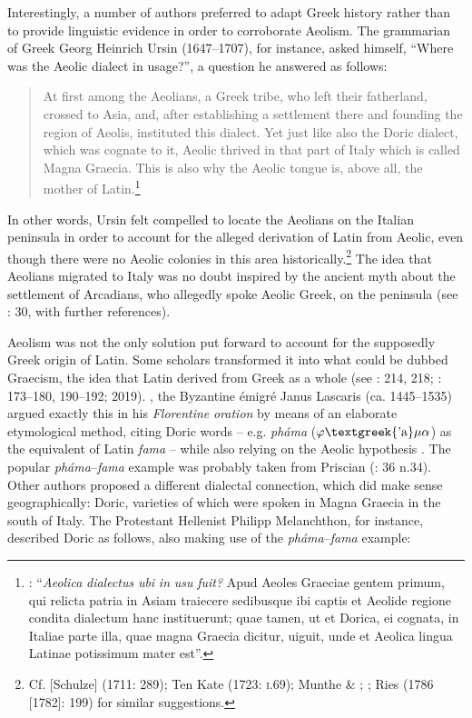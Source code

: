 Interestingly, a number of authors preferred to adapt Greek history rather than to provide linguistic evidence in order to corroborate Aeolism. The grammarian of Greek Georg Heinrich Ursin (1647–1707), for instance, asked himself, “Where was the Aeolic dialect in usage?”, a question he answered as follows:

\begin{quote}
At first among the Aeolians, a Greek tribe, who left their fatherland, crossed to Asia, and, after establishing a settlement there and founding the region of Aeolis, instituted this dialect. Yet just like also the Doric dialect, which was cognate to it, Aeolic thrived in that part of Italy which is called Magna Graecia. This is also why the Aeolic tongue is, above all, the mother of Latin.\footnote{\citet[509]{Ursin1691}: “\textit{Aeolica} \textit{dialectus} \textit{ubi} \textit{in} \textit{usu} \textit{fuit?} Apud Aeoles Graeciae gentem primum, qui relicta patria in Asiam traiecere sedibusque ibi captis et Aeolide regione condita dialectum hanc instituerunt; quae tamen, ut et Dorica, ei cognata, in Italiae parte illa, quae magna Graecia dicitur, uiguit, unde et Aeolica lingua Latinae potissimum mater est”.}
\end{quote}

In other words, Ursin felt compelled to locate the Aeolians on the Italian peninsula in order to account for the alleged derivation of Latin from Aeolic, even though there were no Aeolic colonies in this area historically.\footnote{Cf. [Schulze] (1711: 289); Ten Kate (1723: \textsc{i}.69); Munthe \& \citet[30]{Heiberg1748}; \citet[89]{Facius1782}; Ries (1786 [1782]: 199) for similar suggestions.} The idea that Aeolians migrated to Italy was no doubt inspired by the ancient myth about the settlement of Arcadians, who allegedly spoke Aeolic Greek, on the peninsula (see \citealt{Lamers2019}: 30, with further references).

Aeolism was not the only solution put forward to account for the supposedly Greek origin of Latin. Some scholars transformed it into what could be dubbed Graecism, the idea that Latin derived from Greek as a whole (see \citealt{Tavoni1986}: 214, 218; \citealt{Lamers2015}: 173–180, 190–192; 2019). \citealt{In1493}, the Byzantine émigré Janus Lascaris (ca. 1445–1535) argued exactly this in his \textit{Florentine} \textit{oration} by means of an elaborate etymological method, citing Doric words – e.g. \textit{pháma} ($\varphi \text{\textgreek{'a}}\mu \alpha $) as the equivalent of Latin \textit{fama} – while also relying on the Aeolic hypothesis \citep[179]{Lamers2015}. The popular \textit{pháma}–\textit{fama} example was probably taken from Priscian (\citealt{Lamers2019}: 36 n.34). Other authors proposed a different dialectal connection, which did make sense geographically: Doric, varieties of which were spoken in Magna Graecia in the south of Italy. The Protestant Hellenist Philipp Melanchthon, for instance, described Doric as follows, also making use of the \textit{pháma}–\textit{fama} example:

